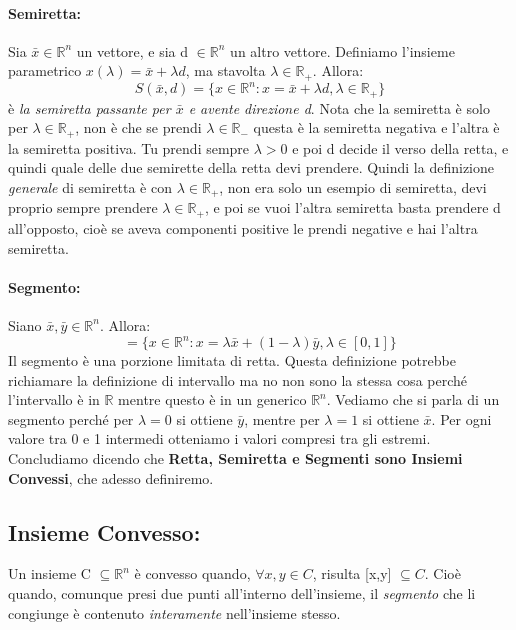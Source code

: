 \paragraph{Semiretta:} Sia $\bar{x} \in \mathbb{R}^n$ un vettore, e sia d $\in \mathbb{R}^n$ un altro vettore. Definiamo l'insieme parametrico $x(\lambda) = \bar{x} + \lambda d$, ma stavolta $\lambda \in \mathbb{R}_+$. Allora:
\begin{equation*}
    S(\bar{x}, d) = \{x \in \mathbb{R}^n: x = \bar{x} + \lambda d, \lambda \in \mathbb{R}_+\}
\end{equation*}
è \textit{la semiretta passante per $\bar{x}$ e avente direzione d}. Nota che la semiretta è solo per $\lambda \in \mathbb{R}_+$, non è che se prendi $\lambda \in \mathbb{R}_-$ questa è la semiretta negativa e l'altra è la semiretta positiva. Tu prendi sempre $\lambda > 0$ e poi d decide il verso della retta, e quindi quale delle due semirette della retta devi prendere. Quindi la definizione \textit{generale} di semiretta è con $\lambda \in \mathbb{R}_+$, non era solo un esempio di semiretta, devi proprio sempre prendere $\lambda \in \mathbb{R}_+$, e poi se vuoi l'altra semiretta basta prendere d all'opposto, cioè se aveva componenti positive le prendi negative e hai l'altra semiretta.

\paragraph{Segmento:} Siano $\bar{x},\bar{y} \in \mathbb{R}^n$. Allora:
\begin{equation*}
    [\bar{x}, \bar{y}] = \{x \in \mathbb{R}^n: x = \lambda\bar{x} + (1 - \lambda)\bar{y}, \lambda \in [0,1]\}
\end{equation*}
Il segmento è una porzione limitata di retta. Questa definizione potrebbe richiamare la definizione di intervallo ma no non sono la stessa cosa perché l'intervallo è in $\mathbb{R}$ mentre questo è in un generico $\mathbb{R}^n$. Vediamo che si parla di un segmento perché per $\lambda = 0$ si ottiene $\bar{y}$, mentre per $\lambda = 1$ si ottiene $\bar{x}$. Per ogni valore tra 0 e 1 intermedi otteniamo i valori compresi tra gli estremi. Concludiamo dicendo che \textbf{Retta, Semiretta e Segmenti sono Insiemi Convessi}, che adesso definiremo. 

\subsection{Insieme Convesso:} Un insieme C $\subseteq \mathbb{R}^n$ è convesso quando, $\forall x,y \in C$, risulta [x,y] $\subseteq C$. Cioè quando, comunque presi due punti all'interno dell'insieme, il \textit{segmento} che li congiunge è contenuto \textit{interamente} nell'insieme stesso. 

